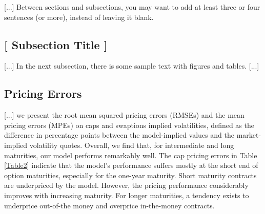 \documentclass[11pt,a4paper,english,oneside]{book}
\numberwithin{equation}{chapter}
\begin{document}
[...] Between sections and subsections, you may want to add at least three or four sentences (or more), instead of leaving it blank.

\subsection{[ Subsection Title ]}

[...] In the next subsection, there is some sample text with figures and tables. [...]




\subsection{Pricing Errors}


[...] we present the root mean squared pricing errors (RMSEs) and the mean pricing errors (MPEs) on caps and swaptions implied volatilities, defined as the difference in percentage points between the model-implied values and the market-implied volatility quotes. Overall, we find that, for intermediate and long maturities, our model performs remarkably well. The cap pricing errors in Table \ref{Table2} indicate that the model's performance suffers mostly at the short end of option maturities, especially for the one-year maturity. Short maturity contracts are underpriced by the model. However, the pricing performance considerably improves with increasing maturity. For longer maturities, a tendency exists to underprice out-of-the money and overprice in-the-money contracts.
\end{document}
